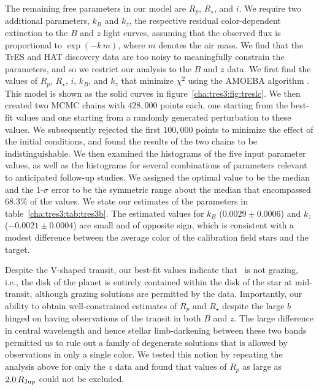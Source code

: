 The remaining free parameters in our model are $R_p$, $R_{\star}$, and $i$.
We require two additional parameters, $k_B$ and $k_z$, the respective residual color-dependent extinction to the $B$ and $z$ light curves, assuming that the observed flux is proportional to $\exp{(-k\, m)}$, where $m$ denotes the air mass.
We find that the TrES and HAT discovery data are too noisy to meaningfully constrain the parameters, and so we restrict our analysis to the $B$ and $z$ data.
We first find the values of $R_p$, $R_{\star}$, $i$, $k_B$, and $k_z$ that minimize ${\chi}^2$ using the AMOEBA algorithm \citep[][]{Press_Teukolsky_Vetterling:1992a}.
This model is shown as the solid curves in figure~\ref{cha:tres3:fig:treslc}.
We then created two MCMC chains with $428,\!000$ points each, one starting from the best-fit values and one starting from a randomly generated perturbation to these values.
We subsequently rejected the first $100,\!000$ points to minimize the effect of the initial conditions, and found the results of the two chains to be indistinguishable.
We then examined the histograms of the five input parameter values, as well as the histograms for several combinations of parameters relevant to anticipated follow-up studies.
We assigned the optimal value to be the median and the 1-$\sigma$ error to be the symmetric range about the median that encompassed 68.3\% of the values.
We state our estimates of the parameters in table~\ref{cha:tres3:tab:tres3b}.
The estimated values for $k_B$ ($0.0029 \pm 0.0006$) and $k_z$ ($-0.0021 \pm 0.0004$) are small and of opposite sign, which is consistent with a modest difference between the average color of the calibration field stars and the target.

Despite the V-shaped transit, our best-fit values indicate that  \tresThree\ is not grazing, i.e., the disk of the planet is entirely contained within the disk of the star at mid-transit, although grazing solutions are permitted by the data.
Importantly, our ability to obtain well-constrained estimates of $R_{p}$ and $R_{\star}$ despite the large $b$ hinged on having observations of the transit in both $B$ and $z$.
The large difference in central wavelength and hence stellar limb-darkening between these two bands permitted us to rule out a family of degenerate solutions that is allowed by observations in only a single color.
We tested this notion by repeating the analysis above for only the $z$ data and found that values of $R_p$ as large as $2.0\,R_{\rm Jup}$ could not be excluded.


